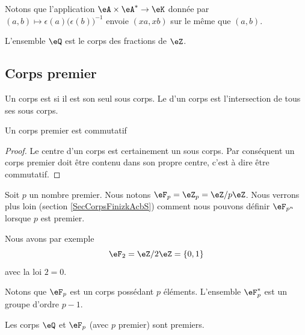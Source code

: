 Notons que l'application \( \eA\times \eA^*\to \eK\) donnée par \( (a,b)\mapsto \epsilon(a)\big( \epsilon(b) \big)^{-1}\) envoie \( (xa,xb)\) sur le même que \( (a,b)\).

L'ensemble \( \eQ\) est le corps des fractions de \( \eZ\).

\subsection{Corps premier}
\label{subseccorpspremhBlYIv}

\begin{definition}
    Un corps est  si il est son seul sous corps. Le  d'un corps est l'intersection de tous ses sous corps.
\end{definition}

\begin{lemma}
    Un corps premier est commutatif
\end{lemma}

\begin{proof}
    Le centre d'un corps est certainement un sous corps. Par conséquent un corps premier doit être contenu dans son propre centre, c'est à dire être commutatif.
\end{proof}

Soit \( p\) un nombre premier. Nous notons \( \eF_p=\eZ_p=\eZ/p\eZ\). Nous verrons plus loin (section \ref{SecCorpsFinizkAcbS}) comment nous pouvons définir \( \eF_{p^n}\) lorsque \( p\) est premier.

Nous avons par exemple 
\begin{equation}
    \eF_2=\eZ/2\eZ=\{ 0,1 \}
\end{equation}
avec la loi \( 2=0\).

Notons que \( \eF_p\) est un corps possédant \( p\) éléments. L'ensemble \( \eF_p^*\) est un groupe d'ordre \( p-1\).

\begin{lemma}
    Les corps \( \eQ\) et \( \eF_p\) (avec \( p\) premier) sont premiers.
\end{lemma}

